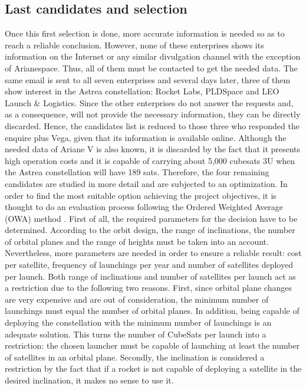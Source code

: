 	\subsection{Last candidates and selection}
Once this first selection is done, more accurate information is needed so as to reach a reliable conclusion. However, none of these enterprises shows its information on the Internet or any similar divulgation channel with the exception of Arianespace. Thus, all of them must be contacted to get the needed data. The same email is sent to all seven enterprises and several days later, three of them show interest in the Astrea constellation: Rocket Labs, PLDSpace and LEO Launch \& Logistics. Since the other enterprises do not answer the requests and, as a consequence, will not provide the necessary information, they can be directly discarded. Hence, the candidates list is reduced to those three who responded the enquire plus Vega, given that its information is available online. Although the needed data of Ariane V is also known, it is discarded by the fact that it presents high operation costs and it is capable of carrying about 5,000 cubesats 3U when the Astrea constellation will have 189 sats. Therefore, the four remaining candidates are studied in more detail and are subjected to an optimization. 
\newline
\newline
In order to find the most suitable option achieving the project objectives, it is thought to do an evaluation process following the Ordered Weighted Average (OWA) method . First of all, the required parameters for the decision have to be determined. According to the orbit design, the range of inclinations, the number of orbital planes and the range of heights must be taken into an account. Nevertheless, more parameters are needed in order to ensure a reliable result: cost per satellite, frequency of launchings per year and number of satellites deployed per launch. Both range of inclinations and number of satellites per launch act as a restriction due to the following two reasons. First, since orbital plane changes are very expensive and are out of consideration, the minimum number of launchings must equal the number of orbital planes. In addition, being capable of deploying the constellation with the minimum number of launchings is an adequate solution. This turns the number of CubeSats per launch into a restriction: the chosen launcher must be capable of launching at least the number of satellites in an orbital plane. Secondly, the inclination is considered a restriction by the fact that if a rocket is not capable of deploying a satellite in the desired inclination, it makes no sense to use it. 

